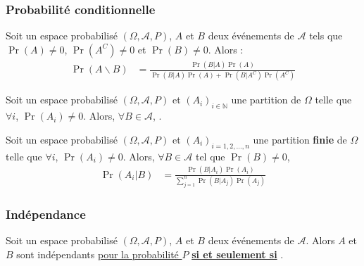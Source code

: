 \documentclass[10pt, french]{article}
\begin{document}
\begin{multicols*}{2}
\subsubsection{Probabilité conditionnelle}
\begin{definitionNOHFILLpropos}
Soit un espace probabilisé $(\Omega, \mathcal{A}, P)$, $A$ et $B$ deux événements de $\mathcal{A}$ tels que $\Pr(A) \neq 0$, $\Pr(A^{C}) \neq 0$  et $\Pr(B) \neq 0$. Alors : 
\begin{align*}
	\Pr(A \smallsetminus B)
	&=	\frac{\Pr(B | A)\Pr(A)}{\Pr(B | A)\Pr(A) + \Pr(B | A^{C})\Pr(A^{C})}
\end{align*}
\end{definitionNOHFILLpropos}


\begin{definitionNOHFILLpropos}
Soit un espace probabilisé $(\Omega, \mathcal{A}, P)$ et $(A_{i})_{i \in \mathbb{N}}$ une partition de $\Omega$ telle que $\forall i$, $\Pr(A_{i}) \neq 0$. Alors, $\forall B \in \mathcal{A}$, .

\end{definitionNOHFILLpropos}
\begin{definitionNOHFILLpropos}
Soit un espace probabilisé $(\Omega, \mathcal{A}, P)$ et $(A_{i})_{i = 1, 2, \dots, n}$ une partition \textbf{finie} de $\Omega$ telle que $\forall i$, $\Pr(A_{i}) \neq 0$. Alors, $\forall B \in \mathcal{A}$ tel que $\Pr(B) \neq 0$,
\begin{align*}
	\Pr(A_{i} | B)
	&=	\frac{\Pr(B | A_{i})\Pr(A_{i})}{\sum_{j = 1}^{n} \Pr(B | A_{j})\Pr(A_{j})}
\end{align*}
\end{definitionNOHFILLpropos}


\columnbreak
\subsubsection{Indépendance}
\begin{definitionNOHFILL}
Soit un espace probabilisé $(\Omega, \mathcal{A}, P)$, $A$ et $B$ deux événements de $\mathcal{A}$. Alors $A$ et $B$ sont indépendants \underline{pour la probabilité $P$} \textbf{\underline{si et seulement si}} .

\bigskip


\end{definitionNOHFILL}
\end{multicols*}
\end{document}
